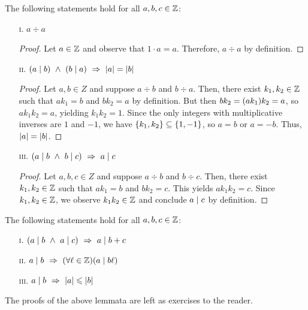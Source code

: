 \begin{lemma}\label{lem:divpartial}
    The following statements hold for all $a, b, c \in \mathbb{Z}$:
    \begin{enumerate}
        \item[\textsc{i}.]
            $a \div a$
            \begin{proof}
                Let $a \in \mathbb{Z}$ and observe that $1 \cdot a = a$.
                Therefore, $a \div a$ by definition.
            \end{proof}
        \item[\textsc{ii}.]
            $\pn*{a \div b} ~\meet~ \pn*{b \div a} \implies \abs{a} = \abs{b}$
            \begin{proof}
                Let $a, b \in Z$ and suppose $a \div b$ and $b \div a$.
                Then, there exist $k_1, k_2 \in \mathbb{Z}$ such that $ak_1 = b$ and $bk_2 = a$ by definition.
                But then $bk_2 = \pn*{ak_1}k_2 = a$, so $ak_1k_2 = a$, yielding $k_1k_2 = 1$.
                Since the only integers with multiplicative inverses are $1$ and $-1$,
                we have $\set*{k_1, k_2} \subseteq \set*{1, -1}$,
                so $a = b$ or $a = -b$.
                Thus, $\lvert a\rvert = \lvert b\rvert$.
            \end{proof}
        \item[\textsc{iii}.]
            $\pn*{a \div b ~\meet~ b \div c} \implies a \div c$
            \begin{proof}
                Let $a, b, c \in Z$ and suppose $a \div b$ and $b \div c$.
                Then, there exist $k_1, k_2 \in \mathbb{Z}$ such that $ak_1 = b$ and $bk_2 = c$.
                This yields $ak_1k_2 = c$.
                Since $k_1, k_2 \in \mathbb{Z}$,
                we observe $k_1k_2 \in \mathbb{Z}$ and conclude $a \mid c$ by definition.
            \end{proof}
    \end{enumerate}
    \vspace{-2ex}
\end{lemma}

\begin{lemma}\label{lem:divalgebra}
    The following statements hold for all $a, b, c \in \mathbb{Z}$:
    \begin{enumerate}
        \item[\textsc{i}.]
            $\pn*{a \div b ~\meet~ a \div c} \implies a \div b + c$
        \item[\textsc{ii}.]
            $a \div b \implies \pn*{\forall \ell \in \Z}\pn*{a \div b\ell}$
        \item[\textsc{iii}.]
            $a \mid b ~\Rightarrow~ \lvert a\rvert \leqslant \lvert b\rvert$
    \end{enumerate}
    The proofs of the above lemmata are left as exercises to the reader.
\end{lemma}

